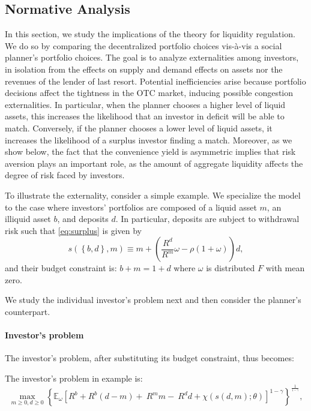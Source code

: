 \documentclass[12pt,american,english,notitlepage]{article}
\begin{document}
\FloatBarrier 
\subsection{Normative Analysis}

In this section, we study the implications of the theory for liquidity regulation. We do so by comparing the decentralized portfolio choices vis-à-vis a social planner's portfolio choices. The goal is to analyze externalities among investors, in isolation
from the effects on supply and demand effects on assets nor the revenues of the lender of last resort. Potential inefficiencies arise because portfolio decisions affect the tightness in the OTC market, inducing possible congestion externalities. In particular, when the planner chooses a higher level of liquid assets, this increases the likelihood
that an investor in deficit will be able to match. Conversely, if the planner chooses a lower level of liquid assets, it increases the likelihood
of a surplus investor finding a match. Moreover, as we show below, the fact that the convenience yield is asymmetric implies that risk aversion plays an important role, as the amount of aggregate liquidity
affects the degree of risk faced by investors.

To illustrate the externality,  consider a simple example. We specialize the model to the case where investors' portfolios are composed of a liquid asset 
$m$, an illiquid asset $b$, and deposits
$d$. In particular, deposits are subject to withdrawal risk such that \eqref{eq:surplus} is given by
\begin{equation}
s\left(\left\{ b,d\right\} ,m\right)\equiv m+\left(\frac{R^{d}}{R^{m}}\omega-\rho(1+\omega)\right)d,\label{eq:withdrawalexample.cash}
\end{equation}
and their budget constraint is: $b+m=1+d$ where $\omega$ is distributed
$F$ with mean zero. 

We study the individual investor's problem next and then consider the planner's counterpart.

\paragraph{Investor's problem}
The investor's problem, after substituting its
budget constraint, thus becomes:

\begin{problem}The investor's problem in
example is:
\[
\max_{m\ge0,d\geq0}\left\{ \mathbb{E}_{\omega}\left[R^{b}+R^{b}(d-m)+\ R^{m}m-\ R^{d}d+\chi\left(s\left(d,m\right);\theta\right)\right]^{1-\gamma}\right\} ^{\frac{1}{^{1-\gamma}}},
\]

\end{problem}
\end{document}

